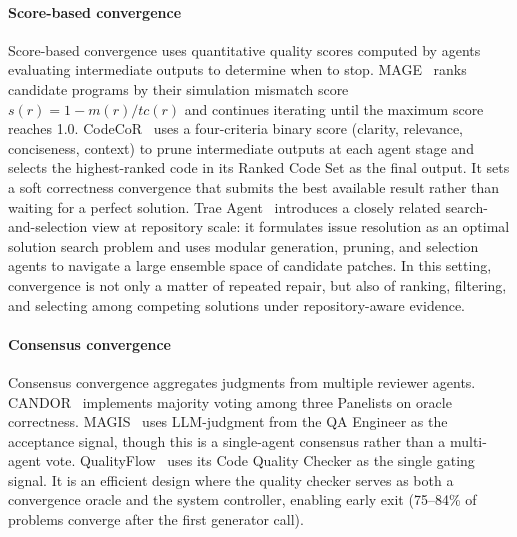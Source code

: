 \documentclass{llmxive}
\begin{document}
\paragraph{Score-based convergence} Score-based convergence uses
quantitative quality scores computed by agents evaluating
intermediate outputs to determine when to stop.
MAGE~\cite{Zhao2024MAGE} ranks candidate programs by their
simulation mismatch score $s(r) = 1 - m(r) / tc(r)$ and
continues iterating until the maximum score reaches 1.0.
CodeCoR~\cite{Pan2025CodeCoR} uses a four-criteria binary score
(clarity, relevance, conciseness, context) to prune intermediate
outputs at each agent stage and selects the highest-ranked code
in its Ranked Code Set as the final output. It sets a soft
correctness convergence that submits the best available result
rather than waiting for a perfect solution. Trae Agent~\cite{gao2025traeagent} introduces a closely related
search-and-selection view at repository scale: it formulates
issue resolution as an optimal solution search problem and uses
modular generation, pruning, and selection agents to navigate a
large ensemble space of candidate patches. In this setting,
convergence is not only a matter of repeated repair, but also of
ranking, filtering, and selecting among competing solutions under
repository-aware evidence.

\paragraph{Consensus convergence} Consensus convergence aggregates
judgments from multiple reviewer agents.
CANDOR~\cite{Xu2025Hallucination} implements majority voting
among three Panelists on oracle correctness.
MAGIS~\cite{Tao2024Magis} uses LLM-judgment from the QA Engineer
as the acceptance signal, though this is a single-agent consensus
rather than a multi-agent vote. QualityFlow~\cite{Hu2025QualityFlow}
uses its Code Quality Checker as the single gating signal. It is
an efficient design where the quality checker serves as both a
convergence oracle and the system controller, enabling early exit
(75--84\% of problems converge after the first generator call).
\end{document}
